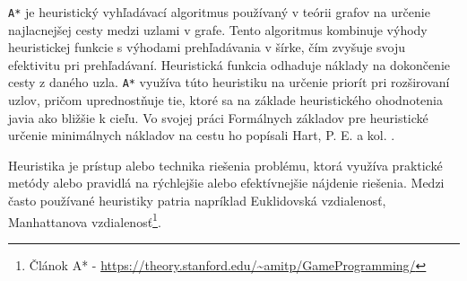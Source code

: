 \texttt{A*} je heuristický vyhľadávací algoritmus používaný v teórii grafov na určenie najlacnejšej cesty medzi uzlami v grafe. Tento algoritmus kombinuje výhody heuristickej funkcie s výhodami prehľadávania v šírke, čím zvyšuje svoju efektivitu pri prehľadávaní. Heuristická funkcia odhaduje náklady na dokončenie cesty z daného uzla. \texttt{A*} využíva túto heuristiku na určenie priorít pri rozširovaní uzlov, pričom uprednostňuje tie, ktoré sa na základe heuristického ohodnotenia javia ako bližšie k cieľu. Vo svojej práci Formálnych základov pre heuristické určenie minimálnych nákladov na cestu ho popísali Hart, P. E. a kol. \cite{hart1968formal}.

Heuristika je prístup alebo technika riešenia problému, ktorá využíva praktické metódy alebo pravidlá na rýchlejšie alebo efektívnejšie nájdenie riešenia. Medzi často používané heuristiky patria napríklad Euklidovská vzdialenosť, Manhattanova vzdialenosť\footnote{Článok A* - \url{https://theory.stanford.edu/~amitp/GameProgramming/}}.

